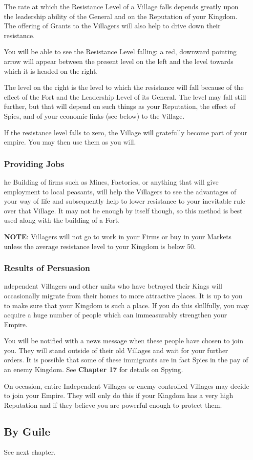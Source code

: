The rate at which the Resistance Level of a Village falls depends greatly upon the leadership ability of the General and on the Reputation of your Kingdom. The offering of Grants to the Villagers will also help to drive down their resistance.

You will be able to see the Resistance Level falling: a red, downward pointing arrow will appear between the present level on the left and the level towards which it is headed on the right.

The level on the right is the level to which the resistance will fall because of the effect of the Fort and the Leadership Level of its General. The level may fall still further, but that will depend on such things as your Reputation, the effect of Spies, and of your economic links (see below) to the Village.

If the resistance level falls to zero, the Village will gratefully become part of your empire. You may then use them as you will.

\subsubsection{Providing Jobs}

he Building of firms such as Mines, Factories, or anything that will give employment to local peasants, will help the Villagers to see the advantages of your way of life and subsequently help to lower resistance to your inevitable rule over that Village. It may not be enough by itself though, so this method is best used along with the building of a Fort.

\textbf{NOTE}: Villagers will not go to work in your Firms or buy in your Markets unless the average resistance level to your Kingdom is below 50. 

\subsubsection{Results of Persuasion}

ndependent Villagers and other units who have betrayed their Kings will occasionally migrate from their homes to more attractive places. It is up to you to make sure that your Kingdom is such a place. If you do this skillfully, you may acquire a huge number of people which can immeasurably strengthen your Empire.

You will be notified with a news message when these people have chosen to join you. They will stand outside of their old Villages and wait for your further orders. It is possible that some of these immigrants are in fact Spies in the pay of an enemy Kingdom. See \textbf{Chapter 17} for details on Spying.

On occasion, entire Independent Villages or enemy-controlled Villages may decide to join your Empire. They will only do this if your Kingdom has a very high Reputation and if they believe you are powerful enough to protect them.

\subsection{By Guile}

See next chapter.